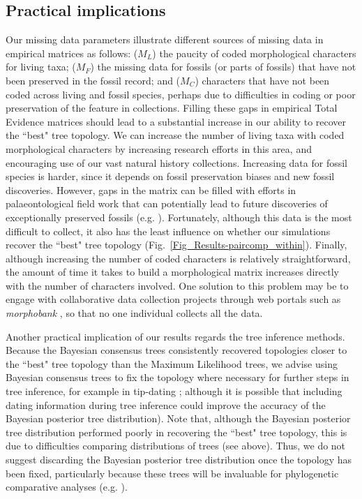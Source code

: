 \documentclass[10pt,letterpaper]{article}
\begin{document}
\subsection*{Practical implications}
Our missing data parameters illustrate different sources of missing data in empirical matrices as follows: ($M_{L}$) the paucity of coded morphological characters for living taxa; ($M_{F}$) the missing data for fossils (or parts of fossils) that have not been preserved in the fossil record; and ($M_{C}$) characters that have not been coded across living and fossil species, perhaps due to difficulties in coding or poor preservation of the feature in collections. Filling these gaps in empirical Total Evidence matrices should lead to a substantial increase in our ability to recover the ``best" tree topology. We can increase the number of living taxa with coded morphological characters by increasing research efforts in this area, and encouraging use of our vast natural history collections. Increasing data for fossil species is harder, since it depends on fossil preservation biases and new fossil discoveries. However, gaps in the matrix can be filled with efforts in palaeontological field work that can potentially lead to future discoveries of exceptionally preserved fossils (e.g. \cite{nithe2013}). Fortunately, although this data is the most difficult to collect, it also has the least influence on whether our simulations recover the ``best" tree topology (Fig.~\ref{Fig_Results-paircomp_within}). Finally, although increasing the number of coded characters is relatively straightforward, the amount of time it takes to build a morphological matrix increases directly with the number of characters involved. One solution to this problem may be to engage with collaborative data collection projects through web portals such as \textit{morphobank} \cite{morphobank}, so that no one individual collects all the data.

Another practical implication of our results regards the tree inference methods. Because the Bayesian consensus trees consistently recovered topologies closer to the ``best" tree topology than the Maximum Likelihood trees, we advise using Bayesian consensus trees to fix the topology where necessary for further steps in tree inference, for example in tip-dating \cite{ronquista2012,BEASTmaster}; although it is possible that including dating information during tree inference could improve the accuracy of the Bayesian posterior tree distribution). Note that, although the Bayesian posterior tree distribution performed poorly in recovering the ``best" tree topology, this is due to difficulties comparing distributions of trees (see above). Thus, we do not suggest discarding the Bayesian posterior tree distribution once the topology has been fixed, particularly because these trees will be invaluable for phylogenetic comparative analyses (e.g. \cite{jetzthe2012}).
\end{document}
